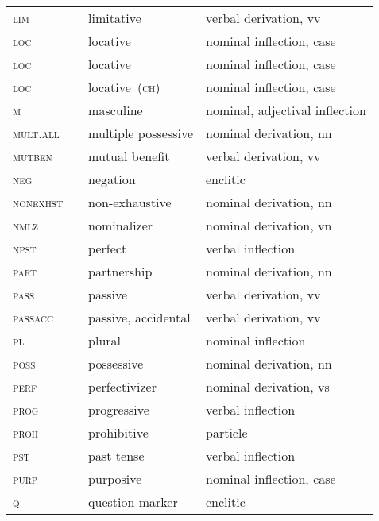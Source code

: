 \begin{refsection}
\begin{small}
\begin{longtable}{*{4}{@{\hspace{1ex}}l}@{\hspace{1ex}}}
\textsc{lim} 	& 	& limitative 				& verbal derivation, vv\\
\textsc{loc} 	&  	& locative 				& nominal inflection, case\\
\textsc{loc} 	&  	& locative 				& nominal inflection, case\\
\textsc{loc} 	&  	& locative~(\textsc{ch}) 		& nominal inflection, case\\
\textsc{m}		&  	& masculine 				& nominal, adjectival inflection\\
\textsc{mult.all}	&  	& multiple possessive 			& nominal derivation, nn\\
\textsc{mutben}		& 		& mutual benefit 			& verbal derivation, vv\\
\textsc{neg} 		&  	& negation 				& enclitic\\
\textsc{nonexhst}&  & non-exhaustive 			& nominal derivation, nn\\
\textsc{nmlz} 		&  	& nominalizer 				& nominal derivation, vn\\
\textsc{npst}	 	&  	& perfect 				& verbal inflection \\
\textsc{part} 		&  	& partnership 				& nominal derivation, nn\\
\textsc{pass} 		&  	& passive 				& verbal derivation, vv\\
\textsc{passacc}&  		& passive, accidental 			& verbal derivation, vv\\
\textsc{pl} 	& 		& plural 				& nominal inflection\\
\textsc{poss} 		&  		& possessive 				& nominal derivation, nn\\
\textsc{perf} 	&  	& perfectivizer				& nominal derivation, vs\\
\textsc{prog} 		&  	& progressive 				& verbal inflection \\
\textsc{proh} 		&  		& prohibitive 				& particle\\
\textsc{pst} 		&  		& past tense 				& verbal inflection\\
\textsc{purp} 		&  	& purposive 				& nominal inflection, case\\
\textsc{q} 		&  	& question marker 			& enclitic\\

\end{longtable}
\end{small}
\end{refsection}
